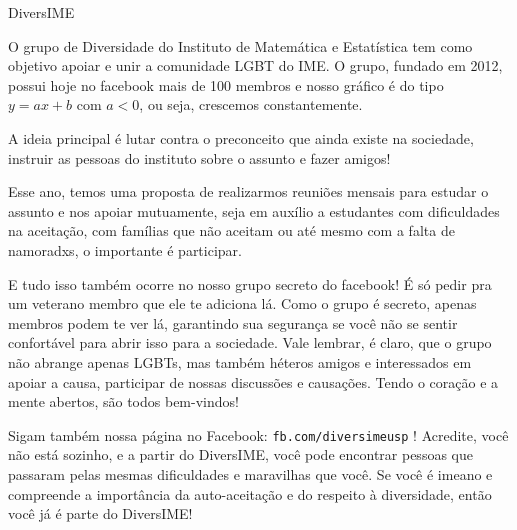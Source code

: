 \begin{secao}{DiversIME}

O grupo de Diversidade do Instituto de Matemática e Estatística tem como objetivo
 apoiar e unir a comunidade LGBT do IME. O grupo, fundado em 2012, possui hoje
 no facebook mais de 100 membros e nosso gráfico é do tipo $y = ax + b$ com $a < 0$,
 ou seja, crescemos constantemente.

A ideia principal é lutar contra o preconceito que ainda existe na sociedade,
 instruir as pessoas do instituto sobre o assunto e fazer amigos!

Esse ano, temos uma proposta de realizarmos reuniões mensais para estudar o
 assunto e nos apoiar mutuamente, seja em auxílio a estudantes com dificuldades
 na aceitação, com famílias que não aceitam ou até mesmo com a falta de
 namoradxs, o importante é participar.

E tudo isso também ocorre no nosso grupo secreto do facebook! É só pedir pra um
 veterano membro que ele te adiciona lá. Como o grupo é secreto, apenas membros
 podem te ver lá, garantindo sua segurança se você não se sentir confortável
 para abrir isso para a sociedade. Vale lembrar, é claro, que o grupo não
 abrange apenas LGBTs, mas também héteros amigos e interessados em apoiar
 a causa, participar de nossas discussões e causações. Tendo o coração e a mente
 abertos, são todos bem-vindos!

Sigam também nossa página no Facebook: {\tt fb.com/diversimeusp} !
Acredite, você não está sozinho, e a partir do DiversIME, você pode encontrar
 pessoas que passaram pelas mesmas dificuldades e maravilhas que você. Se você
 é imeano e compreende a importância da auto-aceitação e do respeito à
 diversidade, então você já é parte do DiversIME!

\end{secao}
